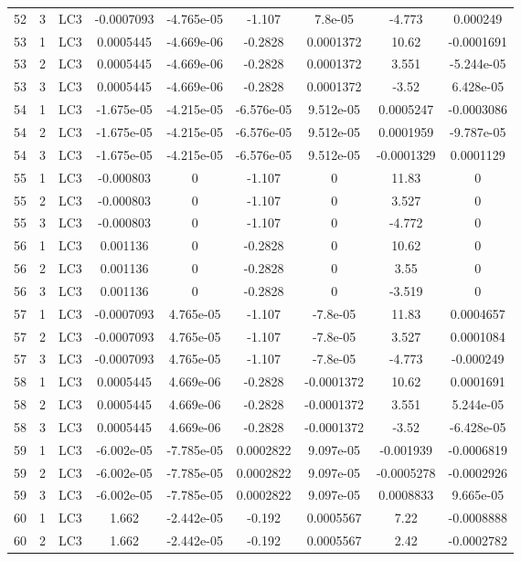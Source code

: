 \documentclass{article}%
\begin{document}
\begin{longtable}{| c c c | c c c c c c |}
52&3&LC3&{-}0.0007093&{-}4.765e{-}05&{-}1.107&7.8e{-}05&{-}4.773&0.000249\\%
53&1&LC3&0.0005445&{-}4.669e{-}06&{-}0.2828&0.0001372&10.62&{-}0.0001691\\%
53&2&LC3&0.0005445&{-}4.669e{-}06&{-}0.2828&0.0001372&3.551&{-}5.244e{-}05\\%
53&3&LC3&0.0005445&{-}4.669e{-}06&{-}0.2828&0.0001372&{-}3.52&6.428e{-}05\\%
54&1&LC3&{-}1.675e{-}05&{-}4.215e{-}05&{-}6.576e{-}05&9.512e{-}05&0.0005247&{-}0.0003086\\%
54&2&LC3&{-}1.675e{-}05&{-}4.215e{-}05&{-}6.576e{-}05&9.512e{-}05&0.0001959&{-}9.787e{-}05\\%
54&3&LC3&{-}1.675e{-}05&{-}4.215e{-}05&{-}6.576e{-}05&9.512e{-}05&{-}0.0001329&0.0001129\\%
55&1&LC3&{-}0.000803&0&{-}1.107&0&11.83&0\\%
55&2&LC3&{-}0.000803&0&{-}1.107&0&3.527&0\\%
55&3&LC3&{-}0.000803&0&{-}1.107&0&{-}4.772&0\\%
56&1&LC3&0.001136&0&{-}0.2828&0&10.62&0\\%
56&2&LC3&0.001136&0&{-}0.2828&0&3.55&0\\%
56&3&LC3&0.001136&0&{-}0.2828&0&{-}3.519&0\\%
57&1&LC3&{-}0.0007093&4.765e{-}05&{-}1.107&{-}7.8e{-}05&11.83&0.0004657\\%
57&2&LC3&{-}0.0007093&4.765e{-}05&{-}1.107&{-}7.8e{-}05&3.527&0.0001084\\%
57&3&LC3&{-}0.0007093&4.765e{-}05&{-}1.107&{-}7.8e{-}05&{-}4.773&{-}0.000249\\%
58&1&LC3&0.0005445&4.669e{-}06&{-}0.2828&{-}0.0001372&10.62&0.0001691\\%
58&2&LC3&0.0005445&4.669e{-}06&{-}0.2828&{-}0.0001372&3.551&5.244e{-}05\\%
58&3&LC3&0.0005445&4.669e{-}06&{-}0.2828&{-}0.0001372&{-}3.52&{-}6.428e{-}05\\%
59&1&LC3&{-}6.002e{-}05&{-}7.785e{-}05&0.0002822&9.097e{-}05&{-}0.001939&{-}0.0006819\\%
59&2&LC3&{-}6.002e{-}05&{-}7.785e{-}05&0.0002822&9.097e{-}05&{-}0.0005278&{-}0.0002926\\%
59&3&LC3&{-}6.002e{-}05&{-}7.785e{-}05&0.0002822&9.097e{-}05&0.0008833&9.665e{-}05\\%
60&1&LC3&1.662&{-}2.442e{-}05&{-}0.192&0.0005567&7.22&{-}0.0008888\\%
60&2&LC3&1.662&{-}2.442e{-}05&{-}0.192&0.0005567&2.42&{-}0.0002782\\%

\end{longtable}
\end{document}
